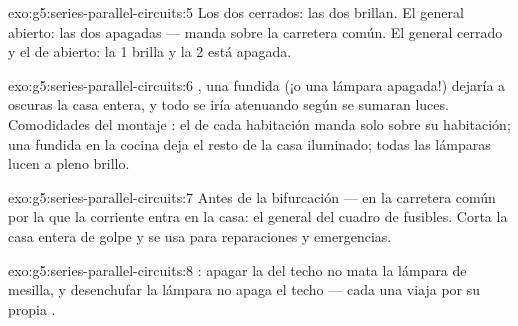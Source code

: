 \begin{solution}{exo:g5:series-parallel-circuits:5}
Los dos cerrados: las dos  brillan. El general abierto: las
dos apagadas --- manda sobre la carretera común. El general cerrado y
el  de  abierto: la  1 brilla y la
 2 está apagada.
\end{solution}

\begin{solution}{exo:g5:series-parallel-circuits:6}
, una  fundida (¡o una lámpara apagada!) dejaría
a oscuras la casa entera, y todo se iría atenuando según se sumaran
luces. Comodidades del montaje : el  de
cada habitación manda solo sobre su habitación; una  fundida
en la cocina deja el resto de la casa iluminado; todas las lámparas
lucen a pleno brillo.
\end{solution}

\begin{solution}{exo:g5:series-parallel-circuits:7}
Antes de la bifurcación --- en la carretera común por la que la
corriente entra en la casa: el  general del cuadro de
fusibles. Corta la casa entera de golpe y se usa para reparaciones y
emergencias.
\end{solution}

\begin{solution}{exo:g5:series-parallel-circuits:8}
: apagar la  del techo no mata la lámpara de
mesilla, y desenchufar la lámpara no apaga el techo --- cada una viaja
por su propia .
\end{solution}

